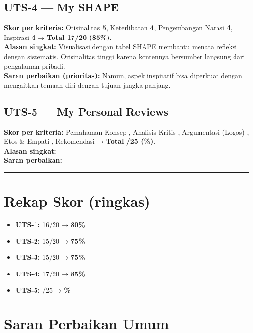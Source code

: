 \documentclass[
  letterpaper,
  DIV=11,
  numbers=noendperiod]{scrreprt}
\providecommand{\tightlist}{%
  \setlength{\itemsep}{0pt}\setlength{\parskip}{0pt}}
\begin{document}
\subsection{UTS-4 --- My SHAPE}\label{uts-4-my-shape}

\textbf{Skor per kriteria:} Orisinalitas \textbf{5}, Keterlibatan
\textbf{4}, Pengembangan Narasi \textbf{4}, Inspirasi \textbf{4} →
\textbf{Total 17/20 (85\%)}.\\
\textbf{Alasan singkat:} Visualisasi dengan tabel SHAPE membantu menata
refleksi dengan sistematis. Orisinalitas tinggi karena kontennya
bersumber langsung dari pengalaman pribadi.\\
\textbf{Saran perbaikan (prioritas):} Namun, aspek inspiratif bisa
diperkuat dengan mengaitkan temuan diri dengan tujuan jangka panjang.

\subsection{UTS-5 --- My Personal
Reviews}\label{uts-5-my-personal-reviews-1}

\textbf{Skor per kriteria:} Pemahaman Konsep , Analisis Kritis ,
Argumentasi (Logos) , Etos \& Empati , Rekomendasi → \textbf{Total /25
(\%)}.\\
\textbf{Alasan singkat:}\\
\textbf{Saran perbaikan:}

\begin{center}\rule{0.5\linewidth}{0.5pt}\end{center}

\section{Rekap Skor (ringkas)}\label{rekap-skor-ringkas}

\begin{itemize}
\tightlist
\item
  \textbf{UTS-1:} 16/20 → \textbf{80\%}
\item
  \textbf{UTS-2:} 15/20 → \textbf{75\%}
\item
  \textbf{UTS-3:} 15/20 → \textbf{75\%}
\item
  \textbf{UTS-4:} 17/20 → \textbf{85\%}
\item
  \textbf{UTS-5:} /25 → \textbf{\%}
\end{itemize}

\section{Saran Perbaikan Umum}\label{saran-perbaikan-umum}
\end{document}
